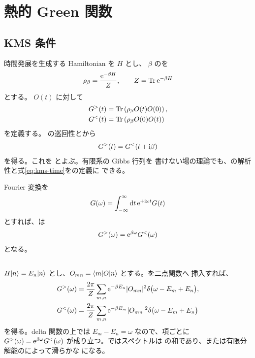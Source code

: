 \chapter{熱的 Green 関数}
\label{chap:thermal-green}

\section{KMS 条件}

時間発展を生成する Hamiltonian を $H$ とし、 $\beta$ のを
\begin{equation}
\rho_\beta
=
\frac{\mathrm{e}^{-\beta H}}{Z},
\qquad
Z
=
\operatorname{Tr}\mathrm{e}^{-\beta H}
\label{eq:gibbs-state}
\end{equation}
とする。 $O(t)$ に対して
\begin{align}
G^>(t)
&=
\operatorname{Tr}\left(
\rho_\beta O(t)O(0)
\right),
\\
G^<(t)
&=
\operatorname{Tr}\left(
\rho_\beta O(0)O(t)
\right)
\end{align}
を定義する。 の巡回性とから
\begin{equation}
G^>(t)
=
G^<(t+\mathrm{i}\beta)
\label{eq:kms-time}
\end{equation}
を得る。これを とよぶ。有限系の Gibbs 行列を
書けない場の理論でも、の解析性と式\eqref{eq:kms-time}をの定義に
できる。

Fourier 変換を
\begin{equation}
G(\omega)
=
\int_{-\infty}^{\infty}\mathrm{d} t\,
\mathrm{e}^{+\mathrm{i}\omega t}G(t)
\label{eq:thermal-fourier}
\end{equation}
とすれば、は 
\begin{equation}
G^>(\omega)
=
\mathrm{e}^{\beta\omega}G^<(\omega)
\label{eq:kms-frequency}
\end{equation}
となる。

\section{}

$H\lvert n \rangle=E_n\lvert n \rangle$ とし、$O_{mn}=\langle m \rvert O\lvert n \rangle$ とする。を二点関数へ
挿入すれば、
\begin{align}
G^>(\omega)
&=
\frac{2\pi}{Z}
\sum_{m,n}
\mathrm{e}^{-\beta E_n}
|O_{mn}|^2
\delta\bigl(\omega-E_m+E_n\bigr),
\label{eq:lehmann-greater}
\\
G^<(\omega)
&=
\frac{2\pi}{Z}
\sum_{m,n}
\mathrm{e}^{-\beta E_m}
|O_{mn}|^2
\delta\bigl(\omega-E_m+E_n\bigr)
\label{eq:lehmann-less}
\end{align}
を得る。delta 関数の上では $E_m-E_n=\omega$ なので、項ごとに
$G^>(\omega)=\mathrm{e}^{\beta\omega}G^<(\omega)$ が成り立つ。ではスペクトルは
の和であり、または有限分解能のによって滑らかな
になる。

